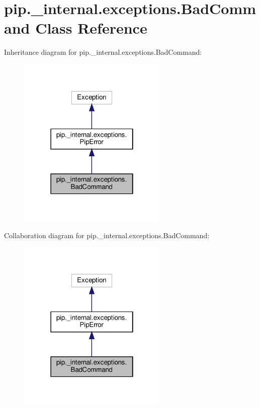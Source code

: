 \hypertarget{classpip_1_1__internal_1_1exceptions_1_1BadCommand}{}\section{pip.\+\_\+internal.\+exceptions.\+Bad\+Command Class Reference}
\label{classpip_1_1__internal_1_1exceptions_1_1BadCommand}


Inheritance diagram for pip.\+\_\+internal.\+exceptions.\+Bad\+Command\+:
\nopagebreak
\begin{figure}[H]
\begin{center}
\leavevmode
\includegraphics[width=202pt]{classpip_1_1__internal_1_1exceptions_1_1BadCommand__inherit__graph}
\end{center}
\end{figure}


Collaboration diagram for pip.\+\_\+internal.\+exceptions.\+Bad\+Command\+:
\nopagebreak
\begin{figure}[H]
\begin{center}
\leavevmode
\includegraphics[width=202pt]{classpip_1_1__internal_1_1exceptions_1_1BadCommand__coll__graph}
\end{center}
\end{figure}


